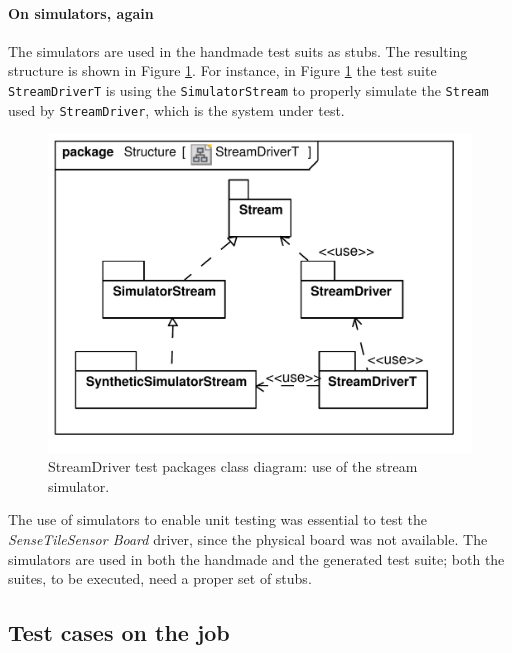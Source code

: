 \documentclass[english]{lni}
\newcommand{\lil}[1]{\texttt{\lstinline|#1|}}
\newcommand{\ST}{\emph{SenseTile}\xspace}
\newcommand{\SB}{\emph{Sensor Board}\xspace}
\newcommand{\STSB}{\ST \SB\xspace}
\begin{document}
\paragraph*{On simulators, again}

The simulators are used in the handmade test suits as stubs.
The resulting structure is shown in Figure \ref{fig:class_diagram_streamdriver_test}.  
For instance, in Figure \ref{fig:class_diagram_streamdriver_test} the test suite \lil{StreamDriverT} is using the \lil{SimulatorStream} to properly simulate the \lil{Stream} used by \lil{StreamDriver}, which is the system under test.

\begin{figure}[htb!]
  \centering
  \includegraphics[scale=0.4]{UML_model/Class_Diagram__Structure__StreamDriverT}
  \caption{StreamDriver test packages class diagram: use of the stream
    simulator.}
  \label{fig:class_diagram_streamdriver_test}
\end{figure}

The use of simulators to enable unit testing was essential to test the \STSB driver, since the physical board was not available.
The simulators are used in both the handmade and the generated test suite; both the suites, to be executed, need a proper set of stubs.



\subsection{Test cases on the job}
\label{subsec:test_cases_on_the_job}
\end{document}
